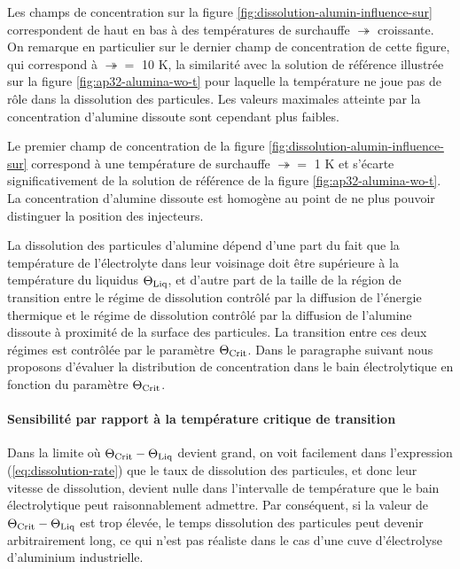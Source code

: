 Les champs de concentration sur la figure
\ref{fig:dissolution-alumin-influence-sur} correspondent de haut en
bas à des températures de surchauffe $\tsur$ croissante. On remarque
en particulier sur le dernier champ de concentration de cette figure,
qui correspond à $\tsur = $ \num{10} \si{\kelvin}, la similarité avec la
solution de référence illustrée sur la figure
\ref{fig:ap32-alumina-wo-t} pour laquelle la température ne joue pas
de rôle dans la dissolution des particules. Les valeurs maximales
atteinte par la concentration d'alumine dissoute sont cependant plus faibles.

Le premier champ de concentration de la figure
\ref{fig:dissolution-alumin-influence-sur} correspond à une
température de surchauffe $\tsur =$ \num{1} \si{\kelvin} et s'écarte
significativement de la solution de référence de la figure
\ref{fig:ap32-alumina-wo-t}. La concentration d'alumine dissoute est
homogène au point de ne plus pouvoir distinguer la position des
injecteurs.

La dissolution des particules d'alumine dépend d'une part du fait que
la température de l'électrolyte dans leur voisinage doit être
supérieure à la température du liquidus $\Theta_\text{Liq}$, et d'autre part de la
taille de la région de transition entre le régime de dissolution
contrôlé par la diffusion de l'énergie thermique et le régime de
dissolution contrôlé par la diffusion de l'alumine dissoute à
proximité de la surface des particules. La transition entre ces deux
régimes est contrôlée par le paramètre $\Theta_\text{Crit}$. Dans le paragraphe
suivant nous proposons d'évaluer la distribution de concentration dans
le bain électrolytique en fonction du paramètre $\Theta_\text{Crit}$.


\clearpage
\paragraph{Sensibilité par rapport à la température critique de transition}


Dans la limite où $\Theta_\text{Crit} - \Theta_\text{Liq}$ devient grand, on voit facilement
dans l'expression (\ref{eq:dissolution-rate}) que le taux de
dissolution des particules, et donc leur vitesse de dissolution,
devient nulle dans l'intervalle de température que le bain
électrolytique peut raisonnablement admettre. Par conséquent, si la
valeur de $\Theta_\text{Crit} - \Theta_\text{Liq}$ est trop élevée, le temps dissolution des
particules peut devenir arbitrairement long, ce qui n'est pas réaliste
dans le cas d'une cuve d'électrolyse d'aluminium industrielle.

